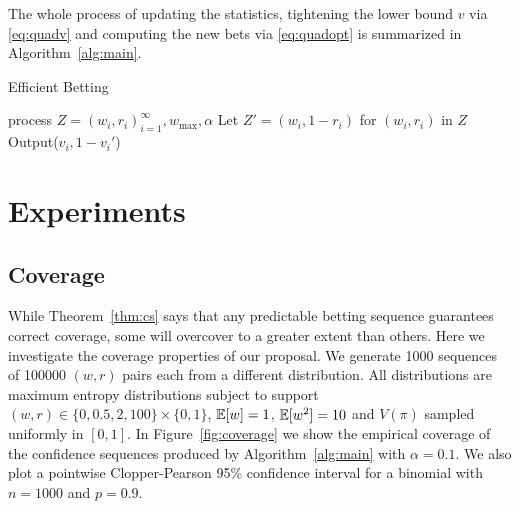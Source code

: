 The whole process of updating the statistics,
tightening the lower bound $v$ via \eqref{eq:quadv}
and computing the new bets via \eqref{eq:quadopt}
is summarized in Algorithm~\ref{alg:main}.

\begin{algorithm}[tb]
   \caption{Efficient Betting}
   \label{alg:main}
\begin{algorithmic}
     process $Z=(w_i,r_i)_{i=1}^\infty, w_{\max}, \alpha$
    \STATE Let $Z' = (w_i,1-r_i)$ for $(w_i,r_i)$ in $Z$
        \STATE Output($v_i,1-v_i'$)
   \ENDFOR
{}
\ENDFUNCTION
\end{algorithmic}
\end{algorithm}

\section{Experiments}

\subsection{Coverage} \label{sec:coverage}
While Theorem~\ref{thm:cs} says that any predictable betting sequence
guarantees correct coverage, some will overcover to a greater extent than others. Here we investigate the coverage properties of our 
proposal. We generate 1000 sequences of 100000 $(w,r)$ pairs 
each from a different distribution. All distributions are 
maximum entropy distributions subject to
support $(w,r) \in \{0, 0.5, 2, 100\} \times \{0,1\}$,
$\mathbb{E}[w]=1$, $\mathbb{E}[w^2]=10$ and $V(\pi)$ sampled uniformly 
in $[0,1]$. In Figure~\ref{fig:coverage} we show the 
empirical coverage of the confidence sequences produced 
by Algorithm~\ref{alg:main} with $\alpha=0.1$. 
We also plot a pointwise Clopper-Pearson 95\% confidence 
interval for a binomial with $n=1000$ and $p=0.9$.


